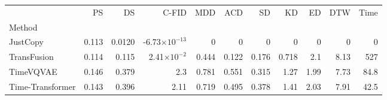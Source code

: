 \begin{tabular}{lrrrrrrrrrr}
{} & {PS} & {DS} & {C-FID} & {MDD} & {ACD} & {SD} & {KD} & {ED} & {DTW} & {Time} \\
{Method} & {} & {} & {} & {} & {} & {} & {} & {} & {} & {} \\
JustCopy & \cellcolor[HTML]{398641}\textcolor[HTML]{f1f1f1}{0.113}& \cellcolor[HTML]{398641}\textcolor[HTML]{f1f1f1}{0.0120}& \cellcolor[HTML]{398641}\textcolor[HTML]{f1f1f1}{-6.73×$10^{-13}$}& \cellcolor[HTML]{398641}\textcolor[HTML]{f1f1f1}{0}& \cellcolor[HTML]{398641}\textcolor[HTML]{f1f1f1}{0}& \cellcolor[HTML]{398641}\textcolor[HTML]{f1f1f1}{0}& \cellcolor[HTML]{398641}\textcolor[HTML]{f1f1f1}{0}& \cellcolor[HTML]{398641}\textcolor[HTML]{f1f1f1}{0}& \cellcolor[HTML]{398641}\textcolor[HTML]{f1f1f1}{0}& \cellcolor[HTML]{398641}\textcolor[HTML]{f1f1f1}{0}\\
TransFusion & \cellcolor[HTML]{3a8742}\textcolor[HTML]{f1f1f1}{0.114}& \cellcolor[HTML]{88b68c}\textcolor[HTML]{f1f1f1}{0.115}& \cellcolor[HTML]{418c49}\textcolor[HTML]{f1f1f1}{2.41×$10^{-2}$}& \cellcolor[HTML]{75ab7b}\textcolor[HTML]{f1f1f1}{0.444}& \cellcolor[HTML]{64a16b}\textcolor[HTML]{f1f1f1}{0.122}& \cellcolor[HTML]{78ad7e}\textcolor[HTML]{f1f1f1}{0.176}& \cellcolor[HTML]{54975a}\textcolor[HTML]{f1f1f1}{0.718}& \cellcolor[HTML]{8fba93}\textcolor[HTML]{000000}{2.1}& \cellcolor[HTML]{73a978}\textcolor[HTML]{f1f1f1}{8.13}& \cellcolor[HTML]{f0e0e4}\textcolor[HTML]{000000}{527}\\
TimeVQVAE & \cellcolor[HTML]{7fb184}\textcolor[HTML]{f1f1f1}{0.146}& \cellcolor[HTML]{e188a2}\textcolor[HTML]{f1f1f1}{0.379}& \cellcolor[HTML]{8bb88f}\textcolor[HTML]{000000}{2.3}& \cellcolor[HTML]{efdae0}\textcolor[HTML]{000000}{0.781}& \cellcolor[HTML]{efdee3}\textcolor[HTML]{000000}{0.551}& \cellcolor[HTML]{aacbae}\textcolor[HTML]{000000}{0.315}& \cellcolor[HTML]{d3e3d5}\textcolor[HTML]{000000}{1.27}& \cellcolor[HTML]{7eb083}\textcolor[HTML]{f1f1f1}{1.99}& \cellcolor[HTML]{5d9d64}\textcolor[HTML]{f1f1f1}{7.73}& \cellcolor[HTML]{58995f}\textcolor[HTML]{f1f1f1}{84.8}\\
Time-Transformer & \cellcolor[HTML]{7aae7f}\textcolor[HTML]{f1f1f1}{0.143}& \cellcolor[HTML]{df7b98}\textcolor[HTML]{f1f1f1}{0.396}& \cellcolor[HTML]{85b48a}\textcolor[HTML]{f1f1f1}{2.11}& \cellcolor[HTML]{ebf2ec}\textcolor[HTML]{000000}{0.719}& \cellcolor[HTML]{ebf2ec}\textcolor[HTML]{000000}{0.495}& \cellcolor[HTML]{c1d8c3}\textcolor[HTML]{000000}{0.378}& \cellcolor[HTML]{f1eaec}\textcolor[HTML]{000000}{1.41}& \cellcolor[HTML]{85b48a}\textcolor[HTML]{f1f1f1}{2.03}& \cellcolor[HTML]{67a26d}\textcolor[HTML]{f1f1f1}{7.91}& \cellcolor[HTML]{489050}\textcolor[HTML]{f1f1f1}{42.5}\\

\end{tabular}
